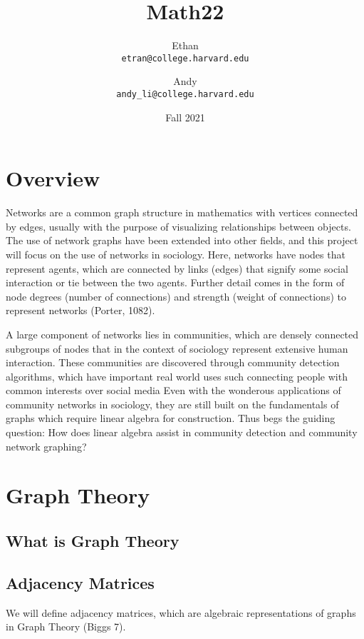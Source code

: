 \documentclass{article}
\title{Math22}
\date{Fall 2021}
\author{Ethan \\ \texttt{etran@college.harvard.edu} \and Andy \\ \texttt{andy\_li@college.harvard.edu}}
\begin{document}
\maketitle

\pagebreak

\tableofcontents

\section{Overview}
Networks are a common graph structure in mathematics with vertices connected by edges, usually with the purpose of visualizing relationships between objects.
The use of network graphs have been extended into other fields, and this project will focus on the use of networks in sociology.
Here, networks have nodes that represent agents, which are connected by links (edges) that signify some social interaction or tie between the two agents.
Further detail comes in the form of node degrees (number of connections) and strength (weight of connections) to represent networks (Porter, 1082). 
 
A large component of networks lies in communities, which are densely connected subgroups of nodes that in the context of sociology represent extensive human interaction.
These communities are discovered through community detection algorithms, which have important real world uses such connecting people with common interests over social media
Even with the wonderous applications of community networks in sociology, they are still built on the fundamentals of graphs which require linear algebra for construction. 
Thus begs the guiding question:
How does linear algebra assist in community detection and community network graphing?

\section{Graph Theory}

\subsection{What is Graph Theory}

\subsection{Adjacency Matrices}
We will define adjacency matrices, which are algebraic representations of graphs in Graph Theory (Biggs 7).
\end{document}
